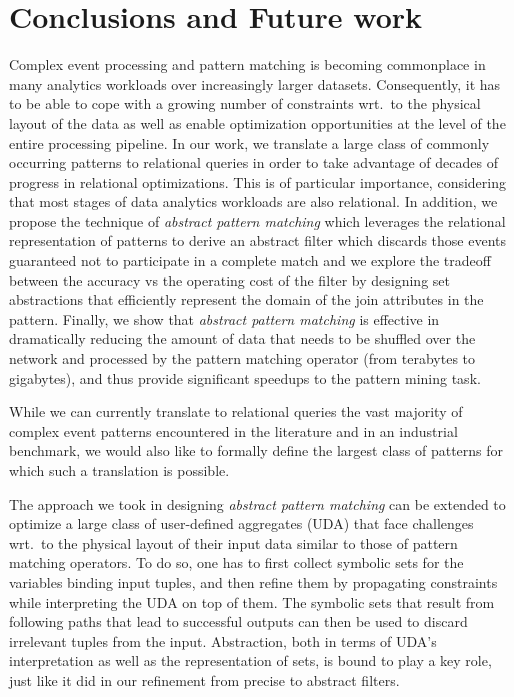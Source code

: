 \section{Conclusions and Future work}
\label{sec:conclusions}

Complex event processing and pattern matching is becoming commonplace in many 
analytics workloads over increasingly larger datasets.
Consequently, it has to be able to cope with a growing number of constraints 
wrt.\ to the physical layout of the data as well as enable optimization 
opportunities at the level of the entire processing pipeline.
In our work, we translate a large class of commonly occurring patterns to 
relational queries in order to take advantage of decades of progress in 
relational optimizations.
This is of particular importance, considering that most stages of data 
analytics workloads are also relational. 
In addition, we propose the technique of {\em abstract pattern matching} which 
leverages the relational representation of patterns to derive an abstract 
filter which discards those events guaranteed not to participate in a complete 
match and we explore the tradeoff between the accuracy vs the operating cost of 
the filter by designing set abstractions that efficiently represent the domain 
of the join attributes in the pattern.
Finally, we show that {\em abstract pattern matching} is effective in 
dramatically reducing the amount of data that needs to be shuffled over the 
network and processed by the pattern matching operator (from terabytes to 
gigabytes), and thus provide significant speedups to the pattern mining task. 

While we can currently translate to relational queries the vast majority of 
complex event patterns encountered in the literature and in an industrial 
benchmark, we would also like to formally define the largest class of patterns 
for which such a translation is possible.

The approach we took in designing {\em abstract pattern matching} can be 
extended to optimize a large class of user-defined aggregates (UDA) that face  
challenges wrt.\ to the physical layout of their input data similar to those of 
pattern matching operators. 
To do so, one has to first collect symbolic sets for the variables binding 
input tuples, 
and then refine them by propagating constraints while     
interpreting the UDA on top of them.
The symbolic sets that result from following paths that lead to successful 
outputs can then be used to discard irrelevant tuples from the input.
Abstraction, both in terms of UDA's interpretation as well as the 
representation of sets, is bound to play a key role, just like it did in our 
refinement from precise to abstract filters.



